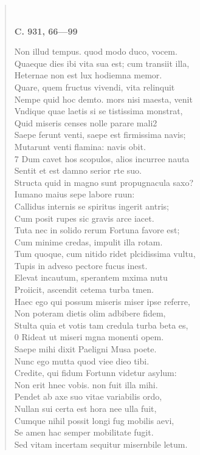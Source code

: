\documentclass[11pt, a4paper]{report}
\begin{document}
\begin{verse}
        ﻿\pagebreak 
     \marginpar{[355]} \begin{center} \textbf{C. 931, 66—99} \end{center}Non illud tempus. quod modo duco, vocem. \\ Quaeque dies ibi vita sua est; cum transiit illa, \\ Heternae non est lux hodiemna memor. \\ Quare, quem fructus vivendi, vita relinquit \\ Nempe quid hoc demto. mors nisi maesta, venit \\ Vndique quae laetis si se tistissima monstrat, \\ Quid miseris censes nolle parare mali2 \\ Saepe ferunt venti, saepe est firmissima navis; \\ Mutarunt venti flamina: navis obit. \\ 7 Dum cavet hos scopulos, alios incurree nauta \\ Sentit et est damno serior rte suo. \\ Structa quid in magno sunt propugnacula saxo? \\ Iumano maius sepe labore ruun: \\ Callidus internis se spiritus ingerit antris; \\ Cum posit rupes sic gravis arce iacet. \\ Tuta nec in solido rerum Fortuna favore est; \\ Cum minime credas, impulit illa rotam. \\ Tum quoque, cum nitido ridet plcidissima vultu, \\ Tupis in adveso pectore fucus inest. \\ Elevat incautum, sperantem mxima nutu \\ Proiicit, ascendit cetema turba tmen. \\ Haec ego qui possum miseris miser ipse referre, \\ Non poteram dietis olim adbibere fidem, \\ Stulta quia et votis tam credula turba beta es, \\ 0 Rideat ut miseri mgna monenti opem. \\ Saepe mihi dixit Paeligni Musa poete. \\ Nunc ego mutta quod viee dieo tibi. \\ Credite, qui fidum Fortunn videtur asylum: \\ Non erit hnec vobis. non fuit illa mihi. \\ Pendet ab axe suo vitae variabilis ordo, \\ Nullan sui certa est hora nee ulla fuit, \\ Cumque nihil possit longi fug mobilis aevi, \\ Se amen hac semper mobilitate fugit. \\ Sed vitam incertam sequitur misernbile letum. \\ 

\end{verse}
\end{document}
